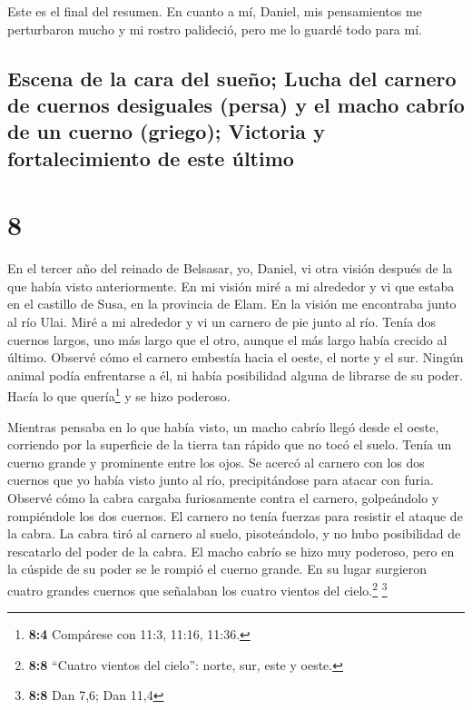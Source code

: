  Este es el final del resumen. En cuanto a mí, Daniel,
mis pensamientos me perturbaron mucho y mi rostro palideció, pero me lo
guardé todo para mí.

\hypertarget{escena-de-la-cara-del-sueuxf1o-lucha-del-carnero-de-cuernos-desiguales-persa-y-el-macho-cabruxedo-de-un-cuerno-griego-victoria-y-fortalecimiento-de-este-uxfaltimo}{%
\subsection{Escena de la cara del sueño; Lucha del carnero de cuernos
desiguales (persa) y el macho cabrío de un cuerno (griego); Victoria y
fortalecimiento de este
último}\label{escena-de-la-cara-del-sueuxf1o-lucha-del-carnero-de-cuernos-desiguales-persa-y-el-macho-cabruxedo-de-un-cuerno-griego-victoria-y-fortalecimiento-de-este-uxfaltimo}}

\hypertarget{section-7}{%
\section{8}\label{section-7}}

 En el tercer año del reinado de Belsasar, yo, Daniel, vi
otra visión después de la que había visto anteriormente. 
En mi visión miré a mi alrededor y vi que estaba en el castillo de Susa,
en la provincia de Elam. En la visión me encontraba junto al río Ulai.
 Miré a mi alrededor y vi un carnero de pie junto al río.
Tenía dos cuernos largos, uno más largo que el otro, aunque el más largo
había crecido al último.  Observé cómo el carnero embestía
hacia el oeste, el norte y el sur. Ningún animal podía enfrentarse a él,
ni había posibilidad alguna de librarse de su poder. Hacía lo que
quería\footnote{\textbf{8:4} Compárese con 11:3, 11:16, 11:36.} y se
hizo poderoso.

 Mientras pensaba en lo que había visto, un macho cabrío
llegó desde el oeste, corriendo por la superficie de la tierra tan
rápido que no tocó el suelo. Tenía un cuerno grande y prominente entre
los ojos.  Se acercó al carnero con los dos cuernos que yo
había visto junto al río, precipitándose para atacar con furia.
 Observé cómo la cabra cargaba furiosamente contra el
carnero, golpeándolo y rompiéndole los dos cuernos. El carnero no tenía
fuerzas para resistir el ataque de la cabra. La cabra tiró al carnero al
suelo, pisoteándolo, y no hubo posibilidad de rescatarlo del poder de la
cabra.  El macho cabrío se hizo muy poderoso, pero en la
cúspide de su poder se le rompió el cuerno grande. En su lugar surgieron
cuatro grandes cuernos que señalaban los cuatro vientos del
cielo.\footnote{\textbf{8:8} ``Cuatro vientos del cielo'': norte, sur,
  este y oeste.} \footnote{\textbf{8:8} Dan 7,6; Dan 11,4}

